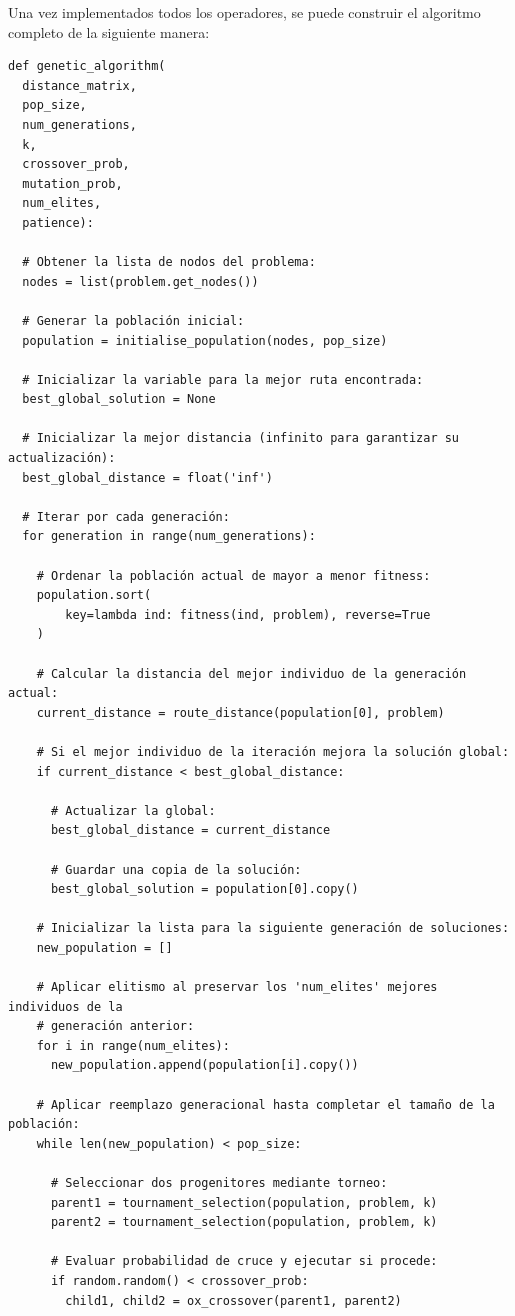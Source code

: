 Una vez implementados todos los operadores, se puede construir el algoritmo completo de la siguiente manera:
\newline
\begin{lstlisting}[style=PythonStyle]
def genetic_algorithm(
  distance_matrix,
  pop_size,
  num_generations,
  k,
  crossover_prob,
  mutation_prob,
  num_elites,
  patience):
    
  # Obtener la lista de nodos del problema:
  nodes = list(problem.get_nodes()) 

  # Generar la población inicial:
  population = initialise_population(nodes, pop_size)

  # Inicializar la variable para la mejor ruta encontrada:
  best_global_solution = None

  # Inicializar la mejor distancia (infinito para garantizar su actualización):
  best_global_distance = float('inf')

  # Iterar por cada generación:
  for generation in range(num_generations):

    # Ordenar la población actual de mayor a menor fitness:
    population.sort(
        key=lambda ind: fitness(ind, problem), reverse=True
    )

    # Calcular la distancia del mejor individuo de la generación actual:
    current_distance = route_distance(population[0], problem)

    # Si el mejor individuo de la iteración mejora la solución global:
    if current_distance < best_global_distance:

      # Actualizar la global:
      best_global_distance = current_distance

      # Guardar una copia de la solución:
      best_global_solution = population[0].copy()

    # Inicializar la lista para la siguiente generación de soluciones:
    new_population = []

    # Aplicar elitismo al preservar los 'num_elites' mejores individuos de la 
    # generación anterior:
    for i in range(num_elites):
      new_population.append(population[i].copy())

    # Aplicar reemplazo generacional hasta completar el tamaño de la población:
    while len(new_population) < pop_size:

      # Seleccionar dos progenitores mediante torneo:
      parent1 = tournament_selection(population, problem, k)
      parent2 = tournament_selection(population, problem, k)

      # Evaluar probabilidad de cruce y ejecutar si procede:
      if random.random() < crossover_prob:
        child1, child2 = ox_crossover(parent1, parent2)


\end{lstlisting}
